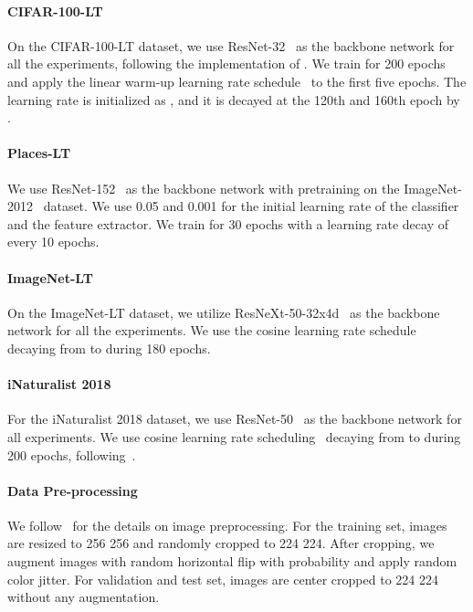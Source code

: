 \documentclass[final]{cvpr}
\begin{document}
\paragraph{CIFAR-100-LT \cite{krizhevsky2009learning}}
On the CIFAR-100-LT dataset, we use ResNet-32~\cite{he2016deep} as the backbone network for all the experiments, following the implementation of \cite{tang2020long}.
We train for 200 epochs and apply the linear warm-up learning rate schedule~\cite{goyal2017accurate} to the first five epochs.
The learning rate is initialized as , and it is decayed at the 120th and 160th epoch by .

\paragraph{Places-LT \cite{zhou2017places}}
We use ResNet-152~\cite{he2016deep} as the backbone network with pretraining on the ImageNet-2012~\cite{deng2009imagenet} dataset.
We use 0.05 and 0.001 for the initial learning rate of the classifier and the feature extractor.
We train for 30 epochs with a learning rate decay of  every 10 epochs.

\paragraph{ImageNet-LT \cite{deng2009imagenet}}
On the ImageNet-LT dataset, we utilize ResNeXt-50-32x4d~\cite{xie2017aggregated} as the backbone network for all the experiments.
We use the cosine learning rate schedule~\cite{loshchilov2016sgdr} decaying from  to  during 180 epochs.

\paragraph{iNaturalist 2018 \cite{van2018inaturalist}}
For the iNaturalist 2018 dataset, we use ResNet-50~\cite{he2016deep} as the backbone network for all experiments.
We use cosine learning rate scheduling~\cite{loshchilov2016sgdr} decaying from  to  during 200 epochs, following~\cite{kang2019decoupling}.

\paragraph{Data Pre-processing}
We follow~\cite{liu2019large} for the details on image preprocessing.
For the training set, images are resized to 256  256 and randomly cropped to 224  224.
After cropping, we augment images with random horizontal flip with probability  and apply random color jitter.
For validation and test set, images are center cropped to 224  224 without any augmentation.
\end{document}
